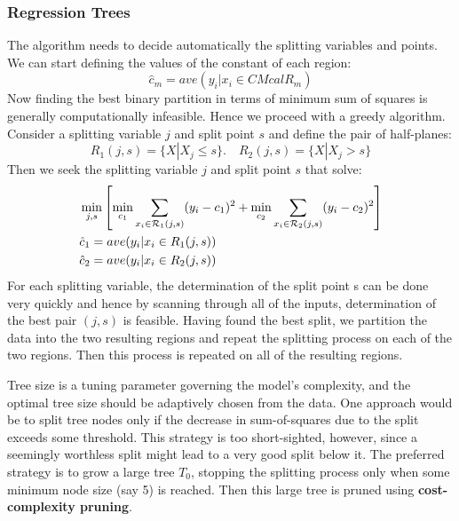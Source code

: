 \documentclass[12pt, letterpaper]{article}
\theoremstyle{definition}
\begin{document}
\subsubsection{Regression Trees}
The algorithm needs to decide automatically the splitting variables and points. We can start defining the values of the constant of each region:
\begin{equation}
\hat{c}_m = ave(y_i|x_i \in CMcal{R}_m)
\end{equation}
Now finding the best binary partition in terms of minimum sum of squares is generally computationally infeasible. Hence we proceed with a greedy algorithm. Consider a splitting variable $j$ and split point $s$ and define the pair of half-planes:
\begin{equation}
R_1(j,s) = \{X|X_j \le s \}. \quad R_2(j,s) = \{X|X_j > s \}
\end{equation}
Then we seek the splitting variable $j$ and split point $s$ that solve:
\begin{equation}
\begin{aligned}
&\min_{j,s}\left[ \min_{c_1} \sum_{x_i \in \CMcal{R}_1(j,s)}  (y_i-c_1)^2 + \min_{c_2} \sum_{x_i \in \CMcal{R}_2(j,s)}  (y_i-c_2)^2\right]\\
&\hat{c}_1 = ave (y_i|x_i \in R_1(j,s)) \\
&\hat{c}_2 = ave (y_i|x_i \in R_2(j,s)) 
\end{aligned}
\end{equation}
For each splitting variable, the determination of the split point s can be done very quickly and hence by scanning through all of the inputs, determination of the best pair $(j, s)$ is feasible. Having found the best split, we partition the data into the two resulting regions and repeat the splitting process on each of the two regions. Then this process is repeated on all of the resulting regions.


Tree size is a tuning parameter governing the model's complexity, and the optimal tree size should be adaptively chosen from the data. One approach would be to split tree nodes only if the decrease in sum-of-squares due to the split exceeds some threshold. This strategy is too short-sighted, however, since a seemingly worthless split might lead to a very good split below it.
The preferred strategy is to grow a large tree $T_0$, stopping the splitting process only when some minimum node size (say 5) is reached. Then this large tree is pruned using \textbf{cost-complexity pruning}.
\end{document}

